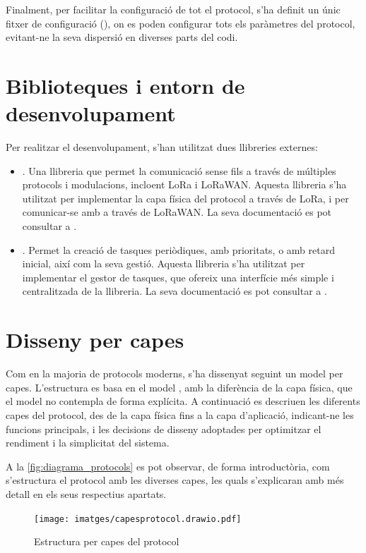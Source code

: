 \documentclass{tfgitic}[2024/07/01]
\begin{document}
Finalment, per facilitar la configuració de tot el protocol, s'ha definit un únic fitxer de configuració (), on es poden configurar tots els paràmetres del protocol, evitant-ne la seva dispersió en diverses parts del codi.

\section{Biblioteques i entorn de desenvolupament}
Per realitzar el desenvolupament, s'han utilitzat dues llibreries externes:
\begin{itemize}
    \item {}. Una llibreria que permet la comunicació sense fils a través de múltiples protocols i modulacions, incloent LoRa i LoRaWAN. Aquesta llibreria s'ha utilitzat per implementar la capa física del protocol a través de LoRa, i per comunicar-se amb  a través de LoRaWAN. La seva documentació es pot consultar a \cite{jan_gromes_radiolib_nodate}. 
    \item {}. Permet la creació de tasques periòdiques, amb prioritats, o amb retard inicial, així com la seva gestió. Aquesta llibreria s'ha utilitzat per implementar el gestor de tasques, que ofereix una interfície més simple i centralitzada de la llibreria. La seva documentació es pot consultar a \cite{arkhipenko_taskscheduler_nodate}.
\end{itemize}

\section{Disseny per capes}
Com en la majoria de protocols moderns, s'ha dissenyat seguint un model per capes. L'estructura es basa en el model , amb la diferència de la capa física, que el model  no contempla de forma explícita. 
A continuació es descriuen les diferents capes del protocol, des de la capa física fins a la capa d'aplicació, indicant-ne les funcions principals, i les decisions de disseny adoptades per optimitzar el rendiment i la simplicitat del sistema.

A la \autoref{fig:diagrama_protocols} es pot observar, de forma introductòria, com s'estructura el protocol amb les diverses capes, les quals s'explicaran amb més detall en els seus respectius apartats. 
\begin{figure}
    \centering
    \texttt{[image: imatges/capesprotocol.drawio.pdf]}
    \caption{Estructura per capes del protocol}
    \label{fig:diagrama_protocols}
\end{figure}
\end{document}
